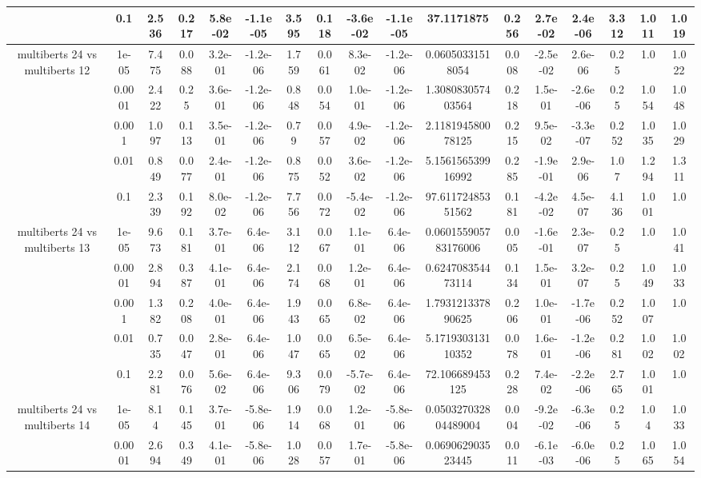\begin{tabular}{|c|c|c|c|c|c|c|c|c|c|c|c|c|c|c|c|c|}
 & 0.1 & 2.536 & 0.217 & 5.8e-02 & -1.1e-05 & 3.595 & 0.118 & -3.6e-02 & -1.1e-05 & 37.1171875 & 0.256 & 2.7e-02 & 2.4e-06 & 3.312 & 1.011 & 1.019 \\
\hline
\multirow{5}{*}{multiberts 24 vs multiberts 12} & 1e-05 & 7.475 & 0.088 & 3.2e-01 & -1.2e-06 & 1.759 & 0.061 & 8.3e-02 & -1.2e-06 & 0.06050331518054 & 0.008 & -2.5e-02 & 2.6e-06 & 0.25 & 1.0 & 1.022 \\
 & 0.0001 & 2.422 & 0.25 & 3.6e-01 & -1.2e-06 & 0.848 & 0.054 & 1.0e-01 & -1.2e-06 & 1.308083057403564 & 0.218 & 1.5e-01 & -2.6e-06 & 0.25 & 1.054 & 1.048 \\
 & 0.001 & 1.097 & 0.113 & 3.5e-01 & -1.2e-06 & 0.79 & 0.057 & 4.9e-02 & -1.2e-06 & 2.118194580078125 & 0.215 & 9.5e-02 & -3.3e-07 & 0.252 & 1.035 & 1.029 \\
 & 0.01 & 0.849 & 0.077 & 2.4e-01 & -1.2e-06 & 0.875 & 0.052 & 3.6e-02 & -1.2e-06 & 5.156156539916992 & 0.285 & -1.9e-01 & 2.9e-06 & 1.07 & 1.294 & 1.311 \\
 & 0.1 & 2.339 & 0.192 & 8.0e-02 & -1.2e-06 & 7.756 & 0.072 & -5.4e-02 & -1.2e-06 & 97.61172485351562 & 0.181 & -4.2e-02 & 4.5e-07 & 4.136 & 1.001 & 1.0 \\
\hline
\multirow{5}{*}{multiberts 24 vs multiberts 13} & 1e-05 & 9.673 & 0.181 & 3.7e-01 & 6.4e-06 & 3.112 & 0.067 & 1.1e-01 & 6.4e-06 & 0.060155905783176006 & 0.005 & -1.6e-01 & 2.3e-07 & 0.25 & 1.0 & 1.041 \\
 & 0.0001 & 2.894 & 0.387 & 4.1e-01 & 6.4e-06 & 2.174 & 0.068 & 1.2e-01 & 6.4e-06 & 0.624708354473114 & 0.134 & 1.5e-01 & 3.2e-07 & 0.25 & 1.049 & 1.033 \\
 & 0.001 & 1.382 & 0.208 & 4.0e-01 & 6.4e-06 & 1.943 & 0.065 & 6.8e-02 & 6.4e-06 & 1.793121337890625 & 0.206 & 1.0e-01 & -1.7e-06 & 0.252 & 1.007 & 1.0 \\
 & 0.01 & 0.735 & 0.047 & 2.8e-01 & 6.4e-06 & 1.047 & 0.065 & 6.5e-02 & 6.4e-06 & 5.171930313110352 & 0.078 & 1.6e-01 & -1.2e-06 & 0.281 & 1.002 & 1.002 \\
 & 0.1 & 2.281 & 0.076 & 5.6e-02 & 6.4e-06 & 9.306 & 0.079 & -5.7e-02 & 6.4e-06 & 72.106689453125 & 0.228 & 7.4e-02 & -2.2e-06 & 2.765 & 1.001 & 1.0 \\
\hline
\multirow{5}{*}{multiberts 24 vs multiberts 14} & 1e-05 & 8.14 & 0.145 & 3.7e-01 & -5.8e-06 & 1.914 & 0.068 & 1.2e-01 & -5.8e-06 & 0.050327032804489004 & 0.004 & -9.2e-02 & -6.3e-06 & 0.25 & 1.04 & 1.033 \\
 & 0.0001 & 2.694 & 0.349 & 4.1e-01 & -5.8e-06 & 1.028 & 0.057 & 1.7e-01 & -5.8e-06 & 0.069062903523445 & 0.011 & -6.1e-03 & -6.0e-06 & 0.25 & 1.065 & 1.054 \\

\end{tabular}
